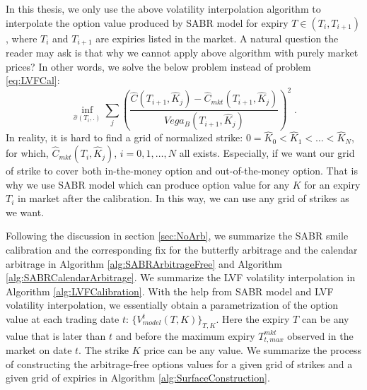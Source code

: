 \documentclass[letterpaper,12pt,titlepage,oneside,final]{book}
\numberwithin{equation}{section}
\theoremstyle{definition}
\begin{document}
In this thesis, we only use the above volatility interpolation algorithm to interpolate the option value produced by SABR model for expiry $T \in (T_i,T_{i+1})$, where $T_i$ and $T_{i+1}$ are expiries listed in the market. 
A natural question the reader may ask is that why  we cannot apply above algorithm with purely market prices? In other words, we solve the below problem instead of problem \eqref{eq:LVFCal}:
\[
\inf_{\widehat{\sigma}(T_i,.)} \sum_{j}(\frac{\widehat{C}(T_{i+1},\widehat{K}_j)-\widehat{C}_{mkt}(T_{i+1},\widehat{K}_j)}{Vega_{B}(T_{i+1},\widehat{K}_j)})^2 \;.
\]
In reality, it is hard to find a grid of normalized strike: $0=\widehat{K}_0<\widehat{K}_1<\dots<\widehat{K}_{N}$, for which,  $\widehat{C}_{mkt}(T_{i},\widehat{K}_j)$, $i=0,1,\dots,N$ all exists.
Especially, if we want our grid of strike to cover both in-the-money option and out-of-the-money option. That is why we use SABR model  which can produce option value for any $K$ for an expiry $T_i$ in market after the calibration. In this way, we can use any grid of strikes as we want.



Following the discussion in section \ref{sec:NoArb}, we summarize the SABR smile calibration and the corresponding fix for the butterfly arbitrage and the calendar arbitrage in Algorithm \ref{alg:SABRArbitrageFree} and Algorithm \ref{alg:SABRCalendarArbitrage}. We summarize the LVF volatility interpolation in Algorithm \ref{alg:LVFCalibration}. With the help from SABR model and LVF volatility interpolation, we essentially obtain a parametrization of the option value at each trading date $t$: $\{V^{t}_{model}(T,K)\}_{T,K}$. Here the expiry $T$  can be any value that is later than $t$ and before  the maximum expiry $T_{t,max}^{mkt}$ observed in the market on date $t$. The strike $K$ price can be any  value. We summarize the process of constructing the arbitrage-free options values for a given grid of strikes and a given grid of expiries in Algorithm \ref{alg:SurfaceConstruction}. 
\end{document}
